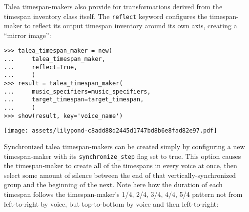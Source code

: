 \noindent Talea timespan-makers also provide for transformations derived from
the timespan inventory class itself. The \texttt{reflect} keyword configures
the timespan-maker to reflect its output timespan inventory around its own
axis, creating a \enquote{mirror image}:

\begin{comment}
<abjad>
talea_timespan_maker = new(
    talea_timespan_maker,
    reflect=True,
    )
result = talea_timespan_maker(
    music_specifiers=music_specifiers,
    target_timespan=target_timespan,
    )
show(result, key='voice_name')
</abjad>
\end{comment}

\begin{abjadbookoutput}
\begin{singlespacing}
\vspace{-0.5\baselineskip}
\begin{verbatim}
>>> talea_timespan_maker = new(
...     talea_timespan_maker,
...     reflect=True,
...     )
>>> result = talea_timespan_maker(
...     music_specifiers=music_specifiers,
...     target_timespan=target_timespan,
...     )
>>> show(result, key='voice_name')
\end{verbatim}
\noindent\texttt{[image: assets/lilypond-c8add88d2445d1747bd8b6e8fad82e97.pdf]}
\end{singlespacing}
\end{abjadbookoutput}

\noindent Synchronized talea timespan-makers can be created simply by
configuring a new timespan-maker with its \texttt{synchronize\_step} flag set
to true. This option causes the timespan-maker to create all of the timespans
in every voice at once, then select some amount of silence between the end of
that vertically-synchronized group and the beginning of the next. Note here how
the duration of each timespan follows the timespan-maker's 1/4, 2/4, 3/4, 4/4,
5/4 pattern not from left-to-right by voice, but top-to-bottom by voice and
then left-to-right:

\begin{comment}
<abjad>
synchronized_talea_timespan_maker = consort.TaleaTimespanMaker(
    playing_talea=rhythmmakertools.Talea(
        counts=(1, 2, 3, 4, 5),
        denominator=8,
        ),
    silence_talea=rhythmmakertools.Talea(
        counts=(4, 7),
        denominator=8,
        ),
    synchronize_step=True,
    )
result = synchronized_talea_timespan_maker(
    music_specifiers=music_specifiers,
    target_timespan=target_timespan,
    )
show(result, key='voice_name')
</abjad>
\end{comment}

